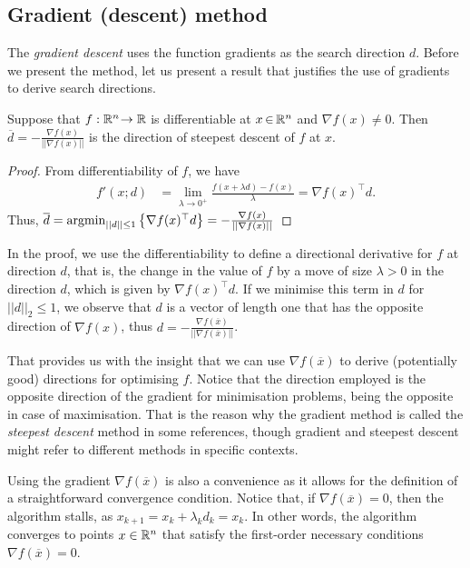 \subsection{Gradient (descent) method}

The \emph{gradient descent} uses the function gradients as the search direction $d$. Before we present the method, let us present a result that justifies the use of gradients to derive search directions. 

\begin{lemma}
Suppose that $f :\mathbb{R}^n\hspace{-2pt} \rightarrow \mathbb{R}$ is differentiable at $x\hspace{-1pt}\in\hspace{-1pt} \mathbb{R}^n$ and $\nabla f(x) \neq 0$. Then $\overline{d} = -\frac{\nabla f(x)}{||\nabla f(x)||}$ is the direction of steepest descent of $f$ at $x$.
\end{lemma}
%
\begin{proof} From differentiability of $f$, we have
\begin{align*}
f'(x; d)& = \lim_{\lambda \rightarrow 0^+} \frac{f(x + \lambda d) - f(x)}{\lambda} = \nabla f(x)^\top d.	
\end{align*}
Thus, $\overline{d} = \mathop{\rm argmin}_{||d|| \leq 1}\left\{ \nabla f(x)^\top d \right \} = -\frac{\nabla f(x)}{||\nabla f(x)||}$
\end{proof}

In the proof, we use the differentiability to define a directional derivative for $f$ at direction $d$, that is, the change in the value of $f$ by a move of size $\lambda >0$ in the direction $d$, which is given by $\nabla f(x)^\top d$. If we minimise this term in $d$ for $||d||_2 \leq 1$, we observe that $d$ is a vector of length one that has the opposite direction of $\nabla f(x)$, thus $d = - \frac{\nabla f(\overline{x})}{||\nabla f(\overline{x})||}$. 

That provides us with the insight that we can use $\nabla f(\overline{x})$ to derive (potentially good) directions for optimising $f$. Notice that the direction employed is the opposite direction of the gradient for minimisation problems, being the opposite in case of maximisation. That is the reason why the gradient method is called the \emph{steepest descent} method in some references, though gradient and steepest descent might refer to different methods in specific contexts.

Using the gradient $\nabla f(\overline{x})$ is also a convenience as it allows for the definition of a straightforward convergence condition. Notice that, if $\nabla f(\overline{x}) = 0$, then the algorithm stalls, as $x_{k+1} = x_k + \lambda_k d_k = x_k$. In other words, the algorithm converges to points $x \in \mathbb{R}^n$ that satisfy the first-order necessary conditions $\nabla f(\overline{x}) = 0$. 

